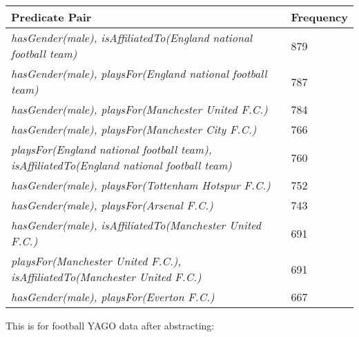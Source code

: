 \documentclass{acm_proc_article-sp}
\begin{document}
\begin{center}
\begin{tabular}{ |p{6cm}|p{1.5cm}| } 
\hline
Predicate Pair & Frequency\\
\hline
\textit{hasGender(male), isAffiliatedTo(England national football team)} & 879 \\
\hline
\textit{hasGender(male), playsFor(England national football team)} & 787 \\
\hline
\textit{hasGender(male), playsFor(Manchester United F.C.)} & 784 \\
\hline
\textit{hasGender(male), playsFor(Manchester City F.C.)} & 766 \\
\hline
\textit{playsFor(England national football team), isAffiliatedTo(England national football team)} & 760 \\
\hline
\textit{hasGender(male), playsFor(Tottenham Hotspur F.C.)} & 752 \\
\hline
\textit{hasGender(male), playsFor(Arsenal F.C.)} & 743 \\
\hline
\textit{hasGender(male), isAffiliatedTo(Manchester United F.C.)} & 691 \\
\hline
\textit{playsFor(Manchester United F.C.), isAffiliatedTo(Manchester United F.C.)} & 691 \\
\hline
\textit{hasGender(male), playsFor(Everton F.C.)} & 667 \\
\hline
\end{tabular}
\end{center}

This is for football YAGO data after abstracting:
\end{document}
